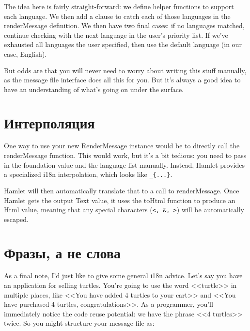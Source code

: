 The idea here is fairly straight-forward: we define helper functions to support each language. We then add a clause to catch each of those languages in the renderMessage definition. We then have two final cases: if no languages matched, continue checking with the next language in the user's priority list. If we've exhausted all languages the user specified, then use the default language (in our case, English).

But odds are that you will never need to worry about writing this stuff manually, as the message file interface does all this for you. But it's always a good idea to have an understanding of what's going on under the surface.

\section{Интерполяция} %

One way to use your new RenderMessage instance would be to directly call the renderMessage function. This would work, but it's a bit tedious: you need to pass in the foundation value and the language list manually. Instead, Hamlet provides a specialized i18n interpolation, which looks like \lstinline'_{...}'.


Hamlet will then automatically translate that to a call to renderMessage. Once Hamlet gets the output Text value, it uses the toHtml function to produce an Html value, meaning that any special characters (\lstinline'<, &, >') will be automatically escaped.

\section{Фразы, а не слова} %

As a final note, I'd just like to give some general i18n advice. Let's say you have an application for selling turtles. You're going to use the word <<turtle>> in multiple places, like <<You have added 4 turtles to your cart>> and <<You have purchased 4 turtles, congratulations>>. As a programmer, you'll immediately notice the code reuse potential: we have the phrase <<4 turtles>> twice. So you might structure your message file as:


